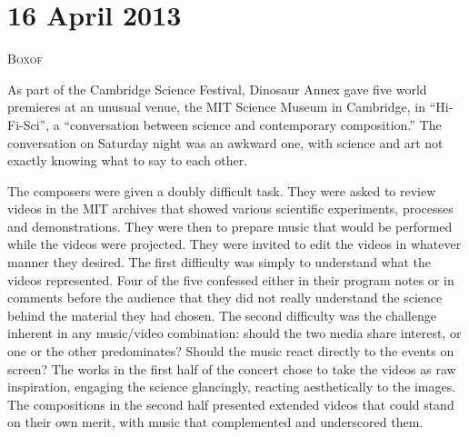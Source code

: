 \chapter{16 April 2013}

\textsc{Boxof}

As part of the Cambridge Science Festival, Dinosaur Annex gave five world premieres at an unusual venue, the MIT Science Museum in Cambridge, in “Hi-Fi-Sci”, a “conversation between science and contemporary composition.” The conversation on Saturday night was an awkward one, with science and art not exactly knowing what to say to each other.

The composers were given a doubly difficult task. They were asked to review videos in the MIT archives that showed various scientific experiments, processes and demonstrations. They were then to prepare music that would be performed while the videos were projected. They were invited to edit the videos in whatever manner they desired. The first difficulty was simply to understand what the videos represented. Four of the five confessed either in their program notes or in comments before the audience that they did not really understand the science behind the material they had chosen. The second difficulty was the challenge inherent in any music/video combination: should the two media share interest, or one or the other predominates? Should the music react directly to the events on screen? The works in the first half of the concert chose to take the videos as raw inspiration, engaging the science glancingly, reacting aesthetically to the images. The compositions in the second half presented extended videos that could stand on their own merit, with music that complemented and underscored them.


